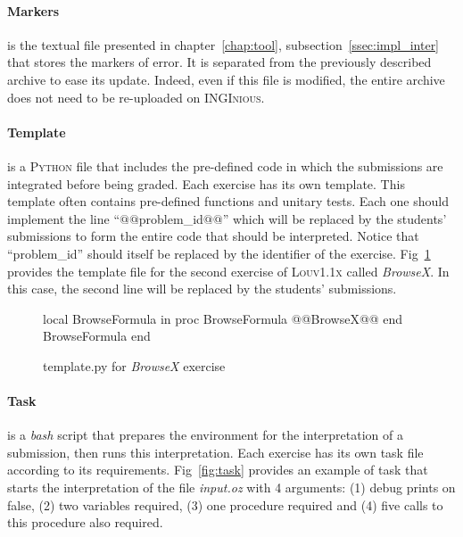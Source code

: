 \documentclass[11pt,a4paper,twoside,openright]{report}
\begin{document}
\paragraph{Markers}
is the textual file presented in chapter~\ref{chap:tool}, 
subsection~\ref{ssec:impl_inter} that stores the markers of error. It is 
separated from the previously described archive to ease its update. Indeed, even 
if this file is modified, the entire archive does not need to be re-uploaded on 
\textsc{INGInious}.

\paragraph{Template}
is a \textsc{Python} file that includes the pre-defined code in which the 
submissions are integrated before being graded. Each exercise has its own 
template. This template often contains pre-defined functions and unitary 
tests. Each one should implement the line \enquote{$@@$problem\_id$@@$} 
which will be replaced by the students' submissions to form the entire code 
that should be interpreted. Notice that \enquote{problem\_id} should itself be 
replaced by the identifier of the exercise. Fig~\ref{fig:template} provides the 
template file for the second exercise of \textsc{Louv1.1x} called 
\textit{BrowseX}. In this case, the second line will be replaced by the students' 
submissions.\\


\begin{figure}[!ht]
  \begin{OZ}
  local BrowseFormula in
	  proc {BrowseFormula}
    		@@BrowseX@@
	  end
  	{BrowseFormula}
  end
  \end{OZ}
 \caption{template.py for \textit{BrowseX} exercise}
 \label{fig:template}
\end{figure}
 
\paragraph{Task}
is a \textit{bash} script that prepares the environment for the 
interpretation of a submission, then runs this interpretation. 
Each exercise has its own task file according to its requirements. 
Fig~\ref{fig:task} provides an example of task that starts the interpretation 
of the file \textit{input.oz} with 4 arguments: (1) debug prints on false, (2) 
two variables required, (3) one procedure required and (4) five calls to this 
procedure also required.\\
\end{document}
